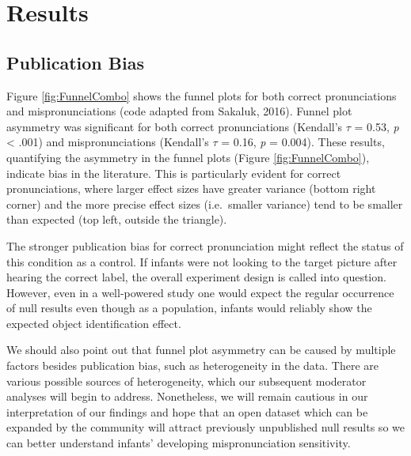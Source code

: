 \documentclass[man]{apa6}
\begin{document}
\hypertarget{results}{%
\section{Results}\label{results}}

\hypertarget{publication-bias-1}{%
\subsection{Publication Bias}\label{publication-bias-1}}

Figure \ref{fig:FunnelCombo} shows the funnel plots for both correct pronunciations and mispronunciations (code adapted from Sakaluk, 2016). Funnel plot asymmetry was significant for both correct pronunciations (Kendall's \(\tau\) = 0.53, \emph{p} \textless{} .001) and mispronunciations (Kendall's \(\tau\) = 0.16, \emph{p} = 0.004). These results, quantifying the asymmetry in the funnel plots (Figure \ref{fig:FunnelCombo}), indicate bias in the literature. This is particularly evident for correct pronunciations, where larger effect sizes have greater variance (bottom right corner) and the more precise effect sizes (i.e.~smaller variance) tend to be smaller than expected (top left, outside the triangle).

The stronger publication bias for correct pronunciation might reflect the status of this condition as a control. If infants were not looking to the target picture after hearing the correct label, the overall experiment design is called into question. However, even in a well-powered study one would expect the regular occurrence of null results even though as a population, infants would reliably show the expected object identification effect.

We should also point out that funnel plot asymmetry can be caused by multiple factors besides publication bias, such as heterogeneity in the data. There are various possible sources of heterogeneity, which our subsequent moderator analyses will begin to address. Nonetheless, we will remain cautious in our interpretation of our findings and hope that an open dataset which can be expanded by the community will attract previously unpublished null results so we can better understand infants' developing mispronunciation sensitivity.
\end{document}

